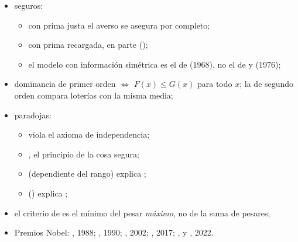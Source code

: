 \documentclass[11pt]{article}
\begin{document}
\begin{itemize}
\begin{itemize}
  \item seguros:
    \begin{itemize}
    \item con prima justa el averso se asegura por completo;
    \item con prima recargada, en parte ();
    \item el modelo con información simétrica es el de  (1968), no el de  y  (1976);
    \end{itemize}
  \item dominancia de primer orden $\iff$ $F(x)\leq G(x)$ para todo $x$; la de segundo orden compara loterías con la misma media;
  \item paradojas:
    \begin{itemize}
    \item {} viola el axioma de independencia;
    \item {}, el principio de la cosa segura;
    \item {} (dependiente del rango) explica ;
    \item {} () explica ;
    \end{itemize}
  \item el criterio de  es el mínimo del pesar \emph{máximo}, no de la suma de pesares;
  \item Premios Nobel: , 1988; , 1990; , 2002; , 2017; ,  y , 2022\nocite{Nobel1988Allais,Nobel1990Markowitz,Nobel2002Kahneman,Nobel2017Thaler,Nobel2022Bancos}.
  \end{itemize}
\end{itemize}

\bibliografia
\end{document}

